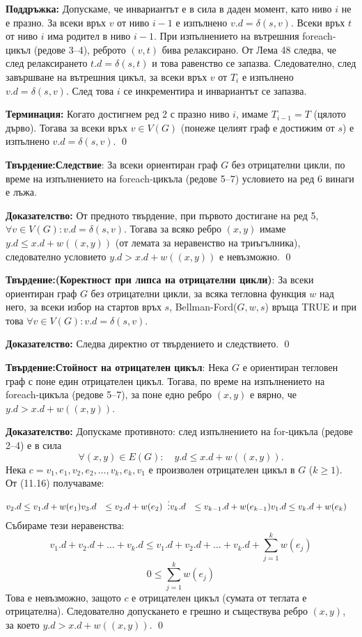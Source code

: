 \documentclass{article}
\renewcommand{\\}{\newline}
\newcommand{\tv}{\textbf{Твърдение:\;}}
\newcommand{\doc}{\textbf{Доказателство: }}
\begin{document}
\noindent \textbf{Поддръжка:} Допускаме, че инвариантът е в сила в даден момент, като ниво \(i\) не е празно. За всеки връх \(v\) от ниво \(i-1\) е изпълнено \(v.d = \delta(s, v)\). Всеки връх \(t\) от ниво \(i\) има родител в ниво \(i-1\). При изпълнението на вътрешния foreach-цикъл (редове 3–4), реброто \((v, t)\) бива релаксирано. От Лема 48 следва, че след релаксирането \(t.d = \delta(s, t)\) и това равенство се запазва. Следователно, след завършване на вътрешния цикъл, за всеки връх \(v\) от \(T_i\) е изпълнено \(v.d = \delta(s, v)\). След това \(i\) се инкрементира и инвариантът се запазва.

\noindent \textbf{Терминация:} Когато достигнем ред 2 с празно ниво \(i\), имаме \(T_{i-1} = T\) (цялото дърво). Тогава за всеки връх \(v \in V(G)\) (понеже целият граф е достижим от \(s\)) е изпълнено \(v.d = \delta(s, v)\). \qed

\tv \textbf{Следствие}:
За всеки ориентиран граф \(G\) без отрицателни цикли, по време на изпълнението на foreach-цикъла (редове 5–7) условието на ред 6 винаги е лъжа.

\doc
От предното твърдение, при първото достигане на ред 5, \(\forall v \in V(G): v.d = \delta(s, v)\). Тогава за всяко ребро \((x, y)\) имаме \(y.d \le x.d + w((x, y))\) (от лемата за неравенство на триъгълника), следователно условието \(y.d > x.d + w((x, y))\) е невъзможно. \qed

\tv \textbf{(Коректност при липса на отрицателни цикли)}:
За всеки ориентиран граф \(G\) без отрицателни цикли, за всяка тегловна функция \(w\) над него, за всеки избор на стартов връх \(s\), Bellman-Ford(\(G, w, s\)) връща TRUE и при това \(\forall v \in V(G): v.d = \delta(s, v)\).

\doc
Следва директно от твърдението и следствието. \qed

\tv \textbf{Стойност на отрицателен цикъл}:
Нека \(G\) е ориентиран тегловен граф с поне един отрицателен цикъл. Тогава, по време на изпълнението на foreach-цикъла (редове 5–7), за поне едно ребро \((x, y)\) е вярно, че \(y.d > x.d + w((x, y))\).

\doc
Допускаме противното: след изпълнението на for-цикъла (редове 2–4) е в сила
\[
\forall (x, y) \in E(G): \quad y.d \le x.d + w((x, y)). \tag{11.16}
\]
Нека \(c = v_1, e_1, v_2, e_2, \dots, v_k, e_k, v_1\) е произволен отрицателен цикъл в \(G\) (\(k \ge 1\)). От (11.16) получаваме:
\begin{align*}
v_2.d &\le v_1.d + w(e_1) \\
v_3.d &\le v_2.d + w(e_2) \\
&\;\;\vdots \\
v_k.d &\le v_{k-1}.d + w(e_{k-1}) \\
v_1.d &\le v_k.d + w(e_k)
\end{align*}
Събираме тези неравенства:
\[
v_1.d + v_2.d + \dots + v_k.d \le v_1.d + v_2.d + \dots + v_k.d + \sum_{j=1}^k w(e_j)
\]
\[
0 \le \sum_{j=1}^k w(e_j)
\]
Това е невъзможно, защото \(c\) е отрицателен цикъл (сумата от теглата е отрицателна). Следователно допускането е грешно и съществува ребро \((x, y)\), за което \(y.d > x.d + w((x, y))\). \qed
\end{document}
